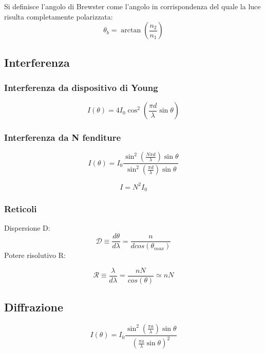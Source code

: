 \documentclass{article}
\begin{document}
Si definisce l'angolo di Brewster come l'angolo in corrispondenza del quale la luce risulta completamente polarizzata:
\begin{equation}
    \theta_b=\arctan(\frac{n_2}{n_1})
\end{equation}

\subsection{Interferenza}
\subsubsection{Interferenza da dispositivo di Young}
\begin{equation}
    I(\theta)=4I_0\cos^2\left(\frac{\pi d}{\lambda}\sin{\theta} \right)
\end{equation}

\subsubsection{Interferenza da N fenditure}
\begin{equation}
    I(\theta)=I_0\frac{\sin^2\left(\frac{N\pi d}{\lambda}\right) \sin{\theta}}{
    \sin^2\left(\frac{\pi d}{\lambda}\right) \sin{\theta}
    }
\end{equation}

\begin{equation}
    I=N^2I_0
\end{equation}

\subsubsection{Reticoli}
Dispersione D:
\begin{equation}
\mathcal{D}\equiv \frac{d\theta}{d \lambda}= \frac{n}{dcos(\theta_{max})}
\end{equation}
Potere risolutivo R:

\begin{equation}
\mathcal{R}\equiv \frac{\lambda}{d \lambda}= \frac{nN}{cos(\theta)}\simeq nN
\end{equation}


\subsection{Diffrazione}
\begin{equation}
    I(\theta)=I_0\frac{\sin^2\left(\frac{\pi a}{\lambda} \right)\sin{\theta}}{\left(\frac{\pi a}{\lambda} \sin{\theta}\right)^2}
\end{equation}
\end{document}
